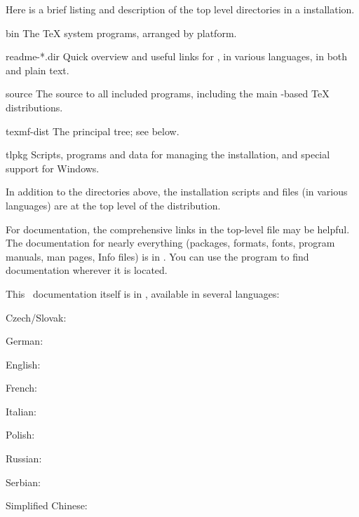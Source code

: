\documentclass{article}
\begin{document}
Here is a brief listing and description of the top level directories in a
\TL{} installation.  

\begin{ttdescription}
\item[bin] The \TeX{} system programs, arranged by platform.
%
\item[readme-*.dir] Quick overview and useful links for \TL{},
in various languages, in both \HTML{} and plain text.
%
\item[source] The source to all included programs, including the main
  \Webc{}-based \TeX{} distributions.
%
\item[texmf-dist] The principal tree; see  below.
%
\item[tlpkg] Scripts, programs and data for managing the
  installation, and special support for Windows.
\end{ttdescription}

In addition to the directories above, the installation scripts and
 files (in various languages) are at the top level of
the distribution.

For documentation, the comprehensive links in the top-level file
 may be helpful.  The documentation for nearly everything
(packages, formats, fonts, program manuals, man pages, Info files) is in
.  You can use the  program to
find documentation wherever it is located.

This \TL\ documentation itself is in ,
available in several languages:

\begin{itemize*}
\item{Czech/Slovak:} 
\item{German:} 
\item{English:} 
\item{French:} 
\item{Italian:} 
\item{Polish:} 
\item{Russian:} 
\item{Serbian:} 
\item{Simplified Chinese:} 
\end{itemize*}
\end{document}
